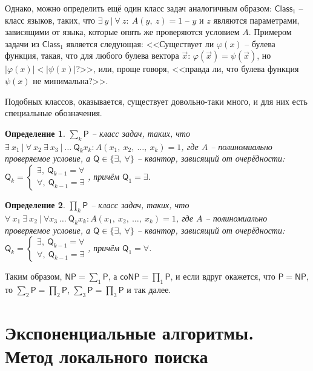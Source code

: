 \documentclass[a4paper,12pt]{article}
\newtheorem{definition}{Определение}
\newcommand{\Pclass}{\mathsf{P}}
\newcommand{\NPclass}{\mathsf{NP}}
\newcommand{\coNPclass}{\mathsf{coNP}}
\newcommand{\Class}{\mathsf{Class}}
\begin{document}
Однако, можно определить ещё один класс задач аналогичным образом: $\Class_1$ -- класс языков, таких, что $\exists\ y\ |\ \forall\ z:\ A(y,\ z) = 1$ -- $y$ и $z$ являются параметрами, зависящими от языка, которые опять же проверяются условием $A$. Примером задачи из $\Class_1$ является следующая: <<Существует ли $\varphi(x)$ -- булева функция, такая, что для любого булева вектора $\vec{x}$: $\varphi(\vec{x}) = \psi(\vec{x})$, но $|\varphi(x)| < |\psi(x)|$?>>, или, проще говоря, <<правда ли, что булева функция $\psi(x)$ не минимальна?>>.

Подобных классов, оказывается, существует довольно-таки много, и для них есть специальные обозначения.
\begin{definition}
    $\sum_k\Pclass$ -- класс задач, таких, что\\ $\exists\ x_1\ |\ \forall\ x_2\ \exists\ x_3\ |\ \ldots\ \mathsf{Q}_kx_k: A(x_1,\ x_2,\ \ldots,\ x_k) = 1$, где $A$ -- полиномиально проверяемое условие, а $\mathsf{Q} \in \{\exists,\ \forall\}$ -- квантор, зависящий от очерёдности: $\mathsf{Q}_k = \begin{cases}\exists,\ \mathsf{Q}_{k - 1} = \forall\\ \forall,\ \mathsf{Q}_{k - 1} = \exists\end{cases}$, причём $\mathsf{Q}_1 = \exists$.
\end{definition}
\begin{definition}
    $\prod_k\Pclass$ -- класс задач, таких, что\\ $\forall\ x_1\ \exists\ x_2\ |\ \forall x_3\ \ldots\ \mathsf{Q}_kx_k: A(x_1,\ x_2,\ \ldots,\ x_k) = 1$, где $A$ -- полиномиально проверяемое условие, а $\mathsf{Q} \in \{\exists,\ \forall\}$ -- квантор, зависящий от очерёдности: $\mathsf{Q}_k = \begin{cases}\exists,\ \mathsf{Q}_{k - 1} = \forall\\ \forall,\ \mathsf{Q}_{k - 1} = \exists\end{cases}$, причём $\mathsf{Q}_1 = \forall$.
\end{definition}
Таким образом, $\NPclass = \sum_1\Pclass$, а $\coNPclass = \prod_1\Pclass$, и если вдруг окажется, что $\Pclass = \NPclass$, то $\sum_2\Pclass = \prod_2\Pclass$, $\sum_3\Pclass = \prod_3\Pclass$ и так далее.

\newpage
\section{Экспоненциальные алгоритмы.\\ Метод локального поиска}
\end{document}
